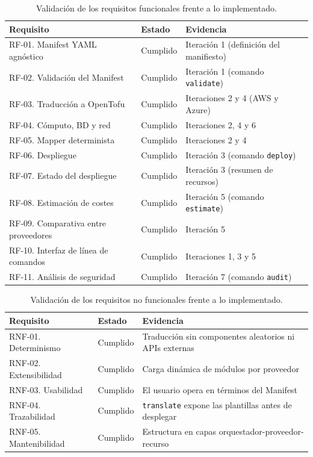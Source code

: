 \begin{table}[H]
\centering
\begin{tabular}{llp{6.2cm}}
\hline
\textbf{Requisito} & \textbf{Estado} & \textbf{Evidencia} \\
\hline
RF-01. Manifest YAML agnóstico      & Cumplido & Iteración 1 (definición del manifiesto) \\
RF-02. Validación del Manifest      & Cumplido & Iteración 1 (comando \texttt{validate}) \\
RF-03. Traducción a OpenTofu        & Cumplido & Iteraciones 2 y 4 (AWS y Azure) \\
RF-04. Cómputo, BD y red            & Cumplido & Iteraciones 2, 4 y 6 \\
RF-05. Mapper determinista          & Cumplido & Iteraciones 2 y 4 \\
RF-06. Despliegue                   & Cumplido & Iteración 3 (comando \texttt{deploy}) \\
RF-07. Estado del despliegue        & Cumplido & Iteración 3 (resumen de recursos) \\
RF-08. Estimación de costes         & Cumplido & Iteración 5 (comando \texttt{estimate}) \\
RF-09. Comparativa entre proveedores& Cumplido & Iteración 5 \\
RF-10. Interfaz de línea de comandos& Cumplido & Iteraciones 1, 3 y 5 \\
RF-11. Análisis de seguridad        & Cumplido & Iteración 7 (comando \texttt{audit}) \\
\hline
\end{tabular}
\caption{Validación de los requisitos funcionales frente a lo implementado.}
\label{tab:validacion-rf}
\end{table}

\begin{table}[H]
\centering
\begin{tabular}{llp{6.2cm}}
\hline
\textbf{Requisito} & \textbf{Estado} & \textbf{Evidencia} \\
\hline
RNF-01. Determinismo    & Cumplido & Traducción sin componentes aleatorios ni APIs externas \\
RNF-02. Extensibilidad  & Cumplido & Carga dinámica de módulos por proveedor \\
RNF-03. Usabilidad      & Cumplido & El usuario opera en términos del Manifest \\
RNF-04. Trazabilidad    & Cumplido & \texttt{translate} expone las plantillas antes de desplegar \\
RNF-05. Mantenibilidad  & Cumplido & Estructura en capas orquestador-proveedor-recurso \\
\hline
\end{tabular}
\caption{Validación de los requisitos no funcionales frente a lo implementado.}
\label{tab:validacion-rnf}
\end{table}

